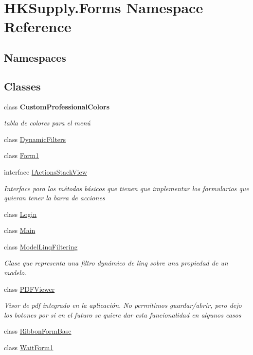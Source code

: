 \hypertarget{namespace_h_k_supply_1_1_forms}{}\section{H\+K\+Supply.\+Forms Namespace Reference}
\label{namespace_h_k_supply_1_1_forms}
\subsection*{Namespaces}
\begin{DoxyCompactItemize}
\end{DoxyCompactItemize}
\subsection*{Classes}
\begin{DoxyCompactItemize}
\item 
class {\bfseries Custom\+Professional\+Colors}
\begin{DoxyCompactList}\small\item\em tabla de colores para el menú \end{DoxyCompactList}\item 
class \mbox{\hyperlink{class_h_k_supply_1_1_forms_1_1_dynamic_filters}{Dynamic\+Filters}}
\item 
class \mbox{\hyperlink{class_h_k_supply_1_1_forms_1_1_form1}{Form1}}
\item 
interface \mbox{\hyperlink{interface_h_k_supply_1_1_forms_1_1_i_actions_stack_view}{I\+Actions\+Stack\+View}}
\begin{DoxyCompactList}\small\item\em Interface para los métodos básicos que tienen que implementar los formularios que quieran tener la barra de acciones \end{DoxyCompactList}\item 
class \mbox{\hyperlink{class_h_k_supply_1_1_forms_1_1_login}{Login}}
\item 
class \mbox{\hyperlink{class_h_k_supply_1_1_forms_1_1_main}{Main}}
\item 
class \mbox{\hyperlink{class_h_k_supply_1_1_forms_1_1_model_linq_filtering}{Model\+Linq\+Filtering}}
\begin{DoxyCompactList}\small\item\em Clase que representa una filtro dynámico de linq sobre una propiedad de un modelo. \end{DoxyCompactList}\item 
class \mbox{\hyperlink{class_h_k_supply_1_1_forms_1_1_p_d_f_viewer}{P\+D\+F\+Viewer}}
\begin{DoxyCompactList}\small\item\em Visor de pdf integrado en la aplicación. No permitimos guardar/abrir, pero dejo los botones por si en el futuro se quiere dar esta funcionalidad en algunos casos \end{DoxyCompactList}\item 
class \mbox{\hyperlink{class_h_k_supply_1_1_forms_1_1_ribbon_form_base}{Ribbon\+Form\+Base}}
\item 
class \mbox{\hyperlink{class_h_k_supply_1_1_forms_1_1_wait_form1}{Wait\+Form1}}
\end{DoxyCompactItemize}
